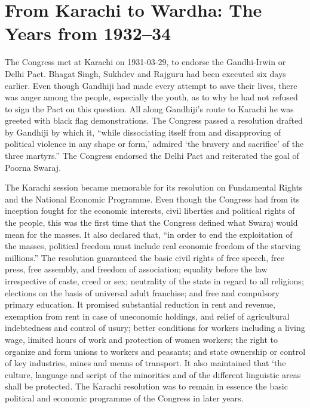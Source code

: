 \chapter{From Karachi to Wardha: The Years from 1932--34}\label{chapter:CH23}
\begin{multicols}{2}

The Congress met at Karachi on 1931-03-29, to endorse the Gandhi-Irwin or Delhi Pact. Bhagat Singh, Sukhdev and Rajguru had been executed six days earlier. Even though Gandhiji had made every attempt to save their lives, there was anger among the people, especially the youth, as to why he had not refused to sign the Pact on this question. All along Gandhiji's route to Karachi he was greeted with black flag demonstrations. The Congress passed a resolution drafted by Gandhiji by which it, ``while dissociating itself from and disapproving of political violence in any shape or form,' admired `the bravery and sacrifice' of the three martyrs.'' The Congress endorsed the Delhi Pact and reiterated the goal of Poorna Swaraj.

The Karachi session became memorable for its resolution on Fundamental Rights and the National Economic Programme. Even though the Congress had from its inception fought for the economic interests, civil liberties and political rights of the people, this was the first time that the Congress defined what Swaraj would mean for the masses. It also declared that, ``in order to end the exploitation of the masses, political freedom must include real economic freedom of the starving millions.'' The resolution guaranteed the basic civil rights of free speech, free press, free assembly, and freedom of association; equality before the law irrespective of caste, creed or sex; neutrality of the state in regard to all religions; elections on the basis of universal adult franchise; and free and compulsory primary education. It promised substantial reduction in rent and revenue, exemption from rent in case of uneconomic holdings, and relief of agricultural indebtedness and control of usury; better conditions for workers including a living wage, limited hours of work and protection of women workers; the right to organize and form unions to workers and peasants; and state ownership or control of key industries, mines and means of transport. It also maintained that `the culture, language and script of the minorities and of the different linguistic areas shall be protected. The Karachi resolution was to remain in essence the basic political and economic programme of the Congress in later years.


\end{multicols}
